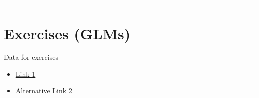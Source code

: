 \documentclass[
]{book}
\providecommand{\tightlist}{%
  \setlength{\itemsep}{0pt}\setlength{\parskip}{0pt}}
\theoremstyle{definition}
\theoremstyle{definition}
\theoremstyle{definition}
\theoremstyle{remark}
\begin{document}
\begin{center}\rule{0.5\linewidth}{0.5pt}\end{center}

\hypertarget{exercises-glms}{%
\section{Exercises (GLMs)}\label{exercises-glms}}

Data for exercises

\begin{itemize}
\tightlist
\item
  \href{https://github.com/olgadet/bookdown-mlbiostatistics/tree/master/data/data.zip}{Link 1}
\item
  \href{https://stockholmuniversity.box.com/s/z5kwg0nlwe5la4h5t8bshpj57pylif14}{Alternative Link 2}
\end{itemize}
\end{document}
